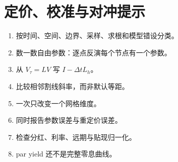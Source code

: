 \chapter{定价、校准与对冲提示}
\begin{enumerate}
  \item 按时间、空间、边界、采样、求根和模型错设分类。
  \item 数一数自由参数：逐点反演每个节点有一个参数。
  \item 从 $V_\tau=LV$ 写 $I-\Delta tL_h$。
  \item 比较相邻割线斜率，而非默认等距。
  \item 一次只改变一个网格维度。
  \item 同时报告参数误差与重定价误差。
  \item 检查分红、利率、远期与贴现归一化。
  \item par yield 还不是完整零息曲线。
\end{enumerate}


\MFQMappedDerivativesNumericsHints
